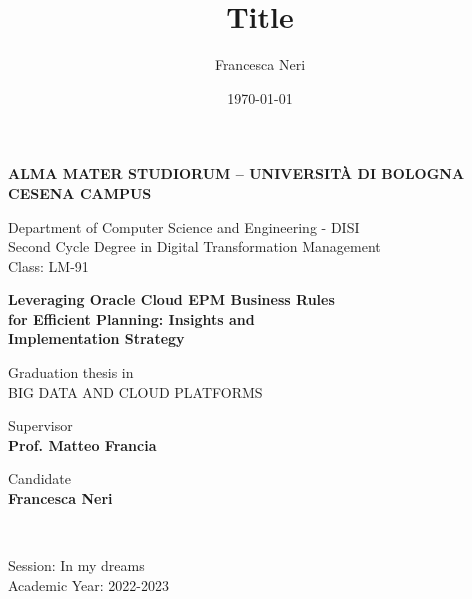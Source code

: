 \title{Title}
\author{Francesca Neri}
\date{\today}

\begin{titlepage}
	\begin{center}
		
		\large
		\textbf{ALMA MATER STUDIORUM -- UNIVERSITÀ DI BOLOGNA \\ CESENA CAMPUS}
		\\
		\noindent\hrulefill
		\vspace{0.4cm}
		
		Department of Computer Science and Engineering - DISI \\
            \vspace{0.1cm}
		Second Cycle Degree in Digital Transformation Management \\
            \vspace{0.1cm}
            Class: LM-91
		
		\Large
		\vspace{4cm}
		\textbf{
            Leveraging Oracle Cloud EPM Business Rules \\
            for Efficient Planning: Insights and \\
            Implementation Strategy
		}
		
		\large
		\vspace{2cm}
		Graduation thesis in \\
		\vspace{0.2cm}
		\textsc{BIG DATA AND CLOUD PLATFORMS}
		
		\vspace{5.5cm}
		\begin{minipage}[t]{0.64\textwidth}
			\begin{flushleft}
				Supervisor \\
				\vspace{0.2cm}
				\textbf{Prof. Matteo Francia}
			\end{flushleft}
		\end{minipage}
		\begin{minipage}[t]{0.34\textwidth}
			\begin{flushright}
				Candidate \\
				\vspace{0.2cm}
				\textbf{Francesca Neri}
			\end{flushright}
		\end{minipage}\\
		
		\vfill
		\noindent\hrulefill
		\vspace{0.3cm}
		\large
		
		Session: In my dreams
		\\
		Academic Year: 2022-2023
	\end{center}
\end{titlepage}
\restoregeometry
